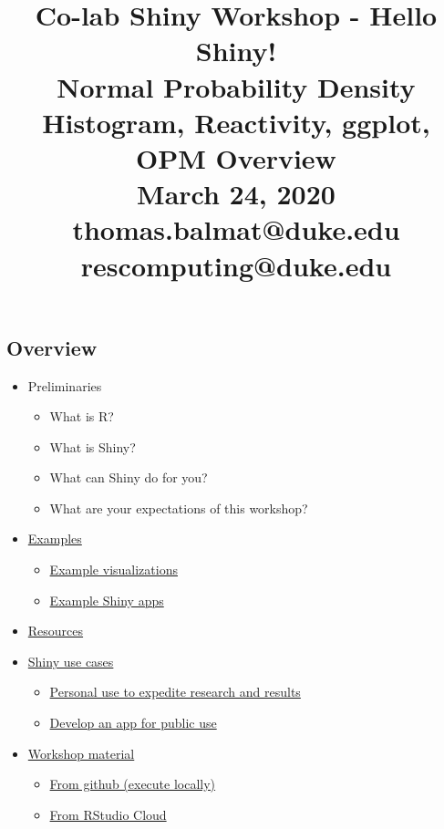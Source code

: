 \documentclass[10pt, letterpaper]{article}
\title{\Large Co-lab Shiny Workshop - Hello Shiny!\\[6pt]
       \large Normal Probability Density Histogram, Reactivity, ggplot, OPM Overview\\[6pt]
       March 24, 2020\\[20pt]
       \normalsize thomas.balmat@duke.edu\\[1pt]rescomputing@duke.edu}
\date{}
\begin{document}
    
\begin{spacing}{1.0}
    
\maketitle


\section{Overview}

\begin{itemize}
    \item Preliminaries
      \begin{itemize}
        \item What is R?
        \item What is Shiny?
        \item What can Shiny do for you?
        \item What are your expectations of this workshop?
      \end{itemize}
    \item \hyperref[sec:examples]{Examples}
      \begin{itemize}
        \item \hyperref[sec:examplevis]{Example visualizations}
        \item \hyperref[sec:exampleapps]{Example Shiny apps}
      \end{itemize}
    \item \hyperref[sec:resources]{Resources}
    \item \hyperref[sec:usecases]{Shiny use cases}
      \begin{itemize}
        \item \hyperref[sec:usecase1]{Personal use to expedite research and results}
        \item \hyperref[sec:usecase2]{Develop an app for public use}
      \end{itemize}
    \item \hyperref[sec:accesworkshopmaterial]{Workshop material}
      \begin{itemize}
        \item \hyperref[sec:materialgit]{From github (execute locally)}
        \item \hyperref[sec:materialcloud]{From RStudio Cloud}

\end{itemize}
\end{itemize}
\end{spacing}
\end{document}
